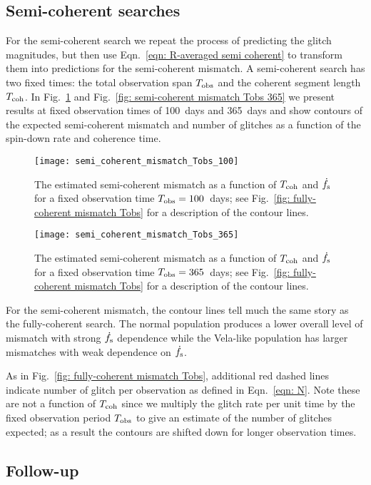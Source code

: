 \documentclass[../full_thesis/full_thesis.tex]{subfiles}
\begin{document}
\subsection{Semi-coherent searches}

For the semi-coherent search we repeat the process of predicting the glitch
magnitudes, but then use Eqn.~\eqref{eqn: R-averaged semi coherent} to
transform them into predictions for the semi-coherent mismatch. A semi-coherent search has two
fixed times: the total observation span $T_{\mathrm{obs}}$ and the coherent segment length
$T_{\mathrm{coh}}$. In Fig.~\ref{fig: semi-coherent mismatch Tobs 100} and Fig.~\ref{fig:
semi-coherent mismatch Tobs 365} we present results at fixed observation times
of 100~days and 365~days and show contours of the expected semi-coherent mismatch and number
of glitches as a function of the spin-down rate and coherence time.
\begin{figure}
\centering
\texttt{[image: semi\_coherent\_mismatch\_Tobs\_100]}
\caption{
The estimated semi-coherent mismatch as a function of $T_{\mathrm{coh}}$ and $\dot{f}_{\textrm{s}}$ for
a fixed observation time $T_{\mathrm{obs}}=100$~days; see Fig.~\ref{fig: fully-coherent
mismatch Tobs} for a description of the contour lines.}
\label{fig: semi-coherent mismatch Tobs 100}
\end{figure}
\begin{figure}
\centering
\texttt{[image: semi\_coherent\_mismatch\_Tobs\_365]}
\caption{
The estimated semi-coherent mismatch as a function of $T_{\mathrm{coh}}$ and $\dot{f}_{\textrm{s}}$ for
a fixed observation time $T_{\mathrm{obs}}=365$~days; see Fig.~\ref{fig: fully-coherent
mismatch Tobs} for a description of the contour lines.}
\label{fig: semi-coherent mismatch Tobs 365}
\end{figure}

For the semi-coherent mismatch, the contour lines tell much the same story as
the fully-coherent search. The normal population produces a lower overall level of
mismatch with strong $\dot{f}_{\textrm{s}}$ dependence while the Vela-like population has
larger mismatches with weak dependence on $\dot{f}_{\textrm{s}}$.

As in Fig.~\ref{fig: fully-coherent mismatch Tobs}, additional red dashed lines
indicate  number of glitch per observation as defined in Eqn.~\eqref{eqn: N}.
Note these are not a function of $T_{\mathrm{coh}}$ since we multiply the glitch rate per
unit time by the fixed observation period $T_{\mathrm{obs}}$ to give an estimate of the
number of glitches expected; as a result the contours are shifted down for
longer observation times.

\subsection{Follow-up}
\end{document}
